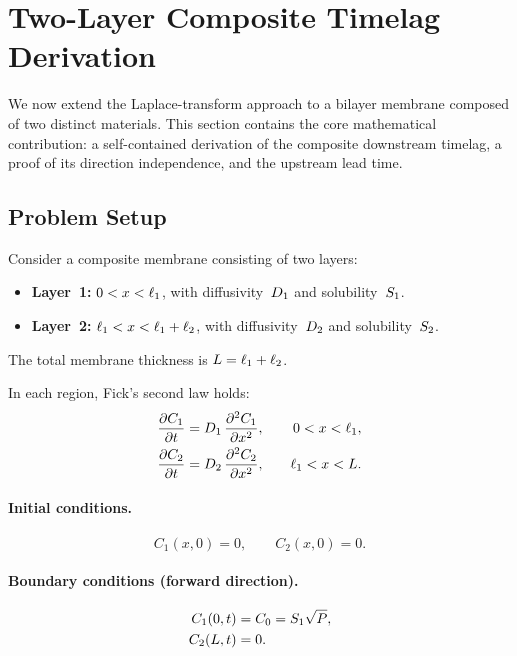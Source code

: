 \section{Two-Layer Composite Timelag Derivation}
\label{sec:two-layer}

We now extend the Laplace-transform approach to a bilayer membrane composed of
two distinct materials.  This section contains the core mathematical
contribution: a self-contained derivation of the composite downstream timelag,
a proof of its direction independence, and the upstream lead time.

\subsection{Problem Setup}
\label{sec:two-layer-setup}

Consider a composite membrane consisting of two layers:
\begin{itemize}
  \item \textbf{Layer~1:} $0 < x < \ell_{1}$, with diffusivity~$D_{1}$ and
        solubility~$S_{1}$.
  \item \textbf{Layer~2:} $\ell_{1} < x < \ell_{1}+\ell_{2}$, with
        diffusivity~$D_{2}$ and solubility~$S_{2}$.
\end{itemize}
The total membrane thickness is $L = \ell_{1} + \ell_{2}$.

In each region, Fick's second law holds:
\begin{align}
  \label{eq:fick-layer1}
  \pdv{C_1}{t} &= D_{1}\,\pdv[2]{C_1}{x},
    &\quad 0 < x < \ell_{1},\\
  \label{eq:fick-layer2}
  \pdv{C_2}{t} &= D_{2}\,\pdv[2]{C_2}{x},
    &\quad \ell_{1} < x < L.
\end{align}

\paragraph{Initial conditions.}
\begin{equation}
  \label{eq:two-ic}
  C_1(x,0) = 0, \qquad C_2(x,0) = 0.
\end{equation}

\paragraph{Boundary conditions (forward direction).}
\begin{align}
  \label{eq:two-bc-up}
  C_1(0,t) &= C_0 = S_{1}\sqrt{P}, \\
  \label{eq:two-bc-down}
  C_2(L,t) &= 0.
\end{align}


